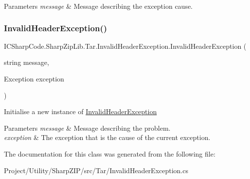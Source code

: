 \begin{DoxyParams}{Parameters}
{\em message} & Message describing the exception cause.\\
\hline
\end{DoxyParams}
\mbox{\label{class_i_c_sharp_code_1_1_sharp_zip_lib_1_1_tar_1_1_invalid_header_exception_ada419ef48dce2ff525546feb3fa4df08}} 
\subsubsection{\texorpdfstring{Invalid\+Header\+Exception()}{InvalidHeaderException()}\hspace{0.1cm}{\footnotesize\ttfamily [4/4]}}
{\footnotesize\ttfamily I\+C\+Sharp\+Code.\+Sharp\+Zip\+Lib.\+Tar.\+Invalid\+Header\+Exception.\+Invalid\+Header\+Exception (\begin{DoxyParamCaption}\item[{string}]{message,  }\item[{Exception}]{exception }\end{DoxyParamCaption})\hspace{0.3cm}{\ttfamily [inline]}}



Initialise a new instance of \hyperlink{class_i_c_sharp_code_1_1_sharp_zip_lib_1_1_tar_1_1_invalid_header_exception}{Invalid\+Header\+Exception} 


\begin{DoxyParams}{Parameters}
{\em message} & Message describing the problem.\\
\hline
{\em exception} & The exception that is the cause of the current exception.\\
\hline
\end{DoxyParams}


The documentation for this class was generated from the following file\+:\begin{DoxyCompactItemize}
\item 
Project/\+Utility/\+Sharp\+Z\+I\+P/src/\+Tar/Invalid\+Header\+Exception.\+cs\end{DoxyCompactItemize}
